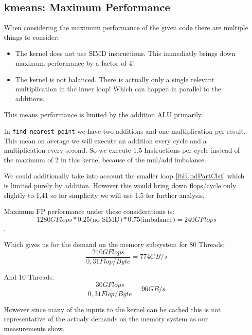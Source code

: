 \documentclass[]{article}
\begin{document}
\subsection{kmeans: Maximum Performance}

When considering the maximum performance of the given code there are multiple things to consider:

\begin{itemize}
	\item The kernel does not use SIMD instructions. This immediatly brings down maximum performance by a factor of 4!
	\item The kernel is not balanced. There is actually only a single relevant multiplication in the inner loop! Which can happen in parallel to the additions.
\end{itemize}

This means performance is limited by the addition ALU primarily.

In \texttt{find\_nearest\_point} we have two additions and one multiplication per result. This mean on average we will execute an addition every cycle and a multiplication every second.
So we execute 1,5 Instructions per cycle instead of the maximum of 2 in this kernel because of the mul/add imbalance.

We could additionally take into account the smaller loop \autoref{lblUpdPartClst} which is limited purely by addition.
However this would bring down flops/cycle only slightly to 1,41 so for simplicity we will use 1.5 for further analysis.

Maximum FP performance under these considerations is:
$$1280 GFlops * 0.25 \text{(no SIMD)}  * 0.75 \text{(imbalance)} = 240 GFlops$$.

Which gives us for the demand on the memory subsystem for 80 Threads:
$$\frac{240 GFlops}{0,31 Flop/Byte} = 774 GB/s$$

And 10 Threads:
$$\frac{30 GFlops}{0,31 Flop/Byte} = 96 GB/s$$

However since many of the inputs to the kernel can be cached this is not representative of the actualy demands on the memory system as our measurements show.
\end{document}
